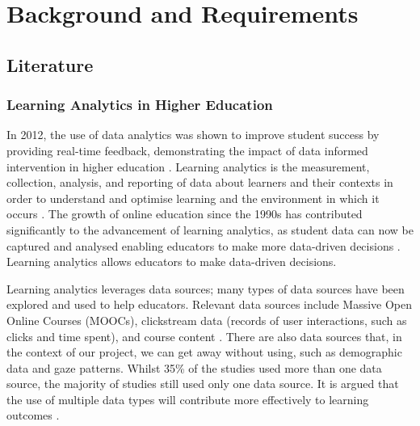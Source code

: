 \section{Background and Requirements}

\subsection{Literature}

\subsubsection{Learning Analytics in Higher Education}



In 2012, the use of data analytics was shown to improve student success by providing real-time feedback, demonstrating the impact of data informed intervention in higher education \cite{nguyen_2020_data}.
Learning analytics is the measurement, collection, analysis, and reporting of data about learners and their contexts in order to understand and optimise learning and the environment in which it occurs \cite{wikipediacontributors_2019_learning_analytics,nguyen_2020_data}. 
The growth of online education since the 1990s has contributed significantly to the advancement of learning analytics, as student data can now be captured and analysed enabling educators to make more data-driven decisions \cite{nguyen_2020_data,vieira_2018_visual}. 
Learning analytics allows educators to make data-driven decisions. 

Learning analytics leverages data sources; many types of data sources have been explored and used to help educators. 
Relevant data sources include Massive Open Online Courses (MOOCs), clickstream data (records of user interactions, such as clicks and time spent), and course content \cite{vieira_2018_visual}.
 There are also data sources that, in the context of our project, we can get away without using, such as demographic data and gaze patterns. 
 Whilst  35\% of the studies used more than one data source, the majority of studies still used only one data source. 
 It is argued that the use of multiple data types will contribute more effectively to learning outcomes \cite{vieira_2018_visual}.

